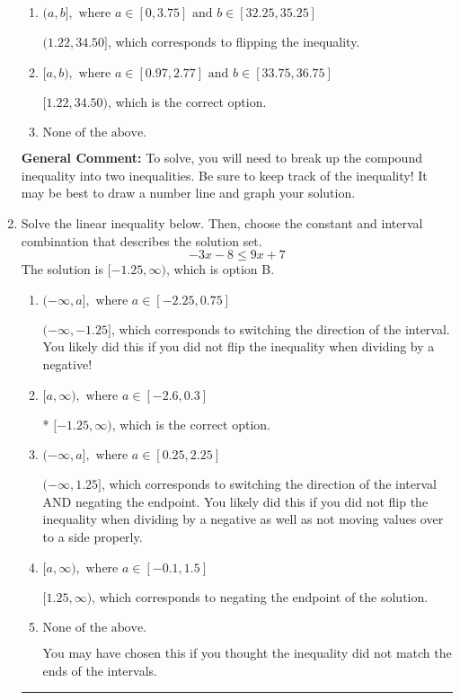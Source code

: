 \documentclass{extbook}[14pt]
\newcommand{\litem}[1]{\item #1

\rule{\textwidth}{0.4pt}}
\begin{document}
\begin{enumerate}
{\begin{enumerate}[label=\Alph*.]
$(-\infty, 1.22) \cup [34.50, \infty)$, which corresponds to displaying the and-inequality as an or-inequality AND flipping the inequality.
\item \( (a, b], \text{ where } a \in [0, 3.75] \text{ and } b \in [32.25, 35.25] \)

$(1.22, 34.50]$, which corresponds to flipping the inequality.
\item \( [a, b), \text{ where } a \in [0.97, 2.77] \text{ and } b \in [33.75, 36.75] \)

$[1.22, 34.50)$, which is the correct option.
\item \( \text{None of the above.} \)


\end{enumerate}

\textbf{General Comment:} To solve, you will need to break up the compound inequality into two inequalities. Be sure to keep track of the inequality! It may be best to draw a number line and graph your solution.
}
\litem{
Solve the linear inequality below. Then, choose the constant and interval combination that describes the solution set.
\[ -3x -8 \leq 9x + 7 \]The solution is \( [-1.25, \infty) \), which is option B.\begin{enumerate}[label=\Alph*.]
\item \( (-\infty, a], \text{ where } a \in [-2.25, 0.75] \)

 $(-\infty, -1.25]$, which corresponds to switching the direction of the interval. You likely did this if you did not flip the inequality when dividing by a negative!
\item \( [a, \infty), \text{ where } a \in [-2.6, 0.3] \)

* $[-1.25, \infty)$, which is the correct option.
\item \( (-\infty, a], \text{ where } a \in [0.25, 2.25] \)

 $(-\infty, 1.25]$, which corresponds to switching the direction of the interval AND negating the endpoint. You likely did this if you did not flip the inequality when dividing by a negative as well as not moving values over to a side properly.
\item \( [a, \infty), \text{ where } a \in [-0.1, 1.5] \)

 $[1.25, \infty)$, which corresponds to negating the endpoint of the solution.
\item \( \text{None of the above}. \)

You may have chosen this if you thought the inequality did not match the ends of the intervals.
\end{enumerate}

}
\end{enumerate}
\end{document}
